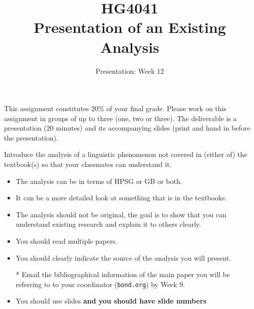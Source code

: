 \documentclass[a4paper,12pt]{article}
\title{HG4041 \\ 
  Presentation of an Existing Analysis}
\date{Presentation: Week 12}
\begin{document}
\maketitle

This assignment constitutes 20\% of your final grade.  Please work on
this assignment in groups of up to three (one, two or three).  The
deliverable is a presentation (20 minutes) and its accompanying slides
(print and hand in before the presentation).

\bigskip\bigskip\bigskip

Introduce the analysis of a linguistic phenomenon not covered in (either of) the
textbook(s) so that your classmates can understand it.
\begin{itemize}
\item The analysis can be in terms of HPSG or GB or both.
\item It can be a more detailed look at something that is in the textbooks.
\item The analysis should not be original, the goal is to show that
  you can understand existing research and explain it to others
  clearly.
\item You should read multiple papers.
\item You should clearly indicate the source of the analysis you will present.
\item[*] Email the bibliographical information of the  main paper you
  will be referring to to your coordinator (\texttt{bond\@ieee.org})
  by Week 9.
\item You should use slides \textbf{and you should have slide numbers}
  
\end{itemize}
\end{document}
